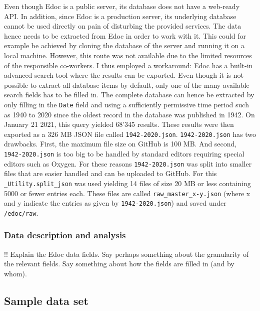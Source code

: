 Even though Edoc is a public server, its database does not have a
web-ready API. In addition, since Edoc is a production server, its
underlying database cannot be used directly on pain of disturbing the
provided services. The data hence needs to be extracted from Edoc in
order to work with it. This could for example be achieved by cloning the
database of the server and running it on a local machine. However, this
route was not available due to the limited resources of the responsible
co-workers. I thus employed a workaround: Edoc has a built-in advanced
search tool where the results can be exported. Even though it is not
possible to extract all database items by default, only one of the many
available search fields has to be filled in. The complete database can
hence be extracted by only filling in the \texttt{Date} field and using
a sufficiently permissive time period such as 1940 to 2020 since the
oldest record in the database was published in 1942. On January 21 2021,
this query yielded 68'345 results. These results were then exported as a
326 MB JSON file called \texttt{1942-2020.json}. \texttt{1942-2020.json}
has two drawbacks. First, the maximum file size on GitHub is 100 MB. And
second, \texttt{1942-2020.json} is too big to be handled by standard
editors requiring special editors such as Oxygen. For these reasons
\texttt{1942-2020.json} was split into smaller files that are easier
handled and can be uploaded to GitHub. For this
\texttt{\_Utility.split\_json} was used yielding 14 files of size 20 MB
or less containing 5000 or fewer entries each. These files are called
\texttt{raw\_master\_x-y.json} (where x and y indicate the entries as
given by \texttt{1942-2020.json}) and saved under \texttt{/edoc/raw}.

\hypertarget{data-description-and-analysis}{%
\subsubsection{Data description and
analysis}\label{data-description-and-analysis}}

!! Explain the Edoc data fields. Say perhaps something about the
granularity of the relevant fields. Say something about how the fields
are filled in (and by whom).

\hypertarget{sample-data-set}{%
\subsection{Sample data set}\label{sample-data-set}}

